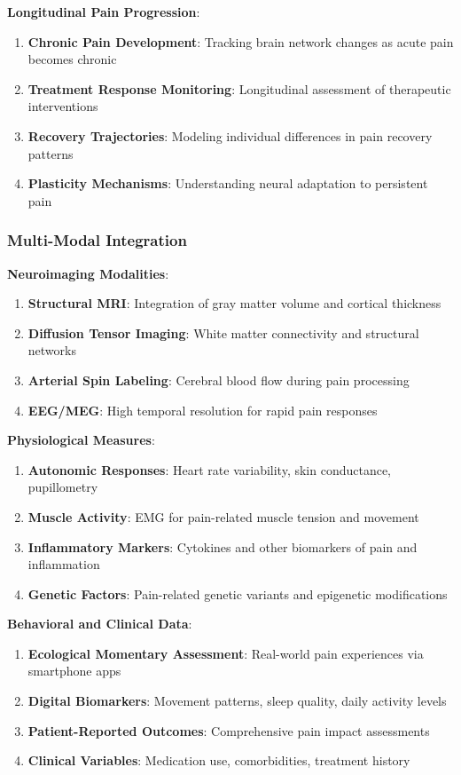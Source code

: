 \documentclass[10pt,journal,compsoc]{IEEEtran}
\begin{document}
\textbf{Longitudinal Pain Progression}:

\begin{enumerate}
\item \textbf{Chronic Pain Development}: Tracking brain network changes as acute pain becomes chronic
\item \textbf{Treatment Response Monitoring}: Longitudinal assessment of therapeutic interventions
\item \textbf{Recovery Trajectories}: Modeling individual differences in pain recovery patterns
\item \textbf{Plasticity Mechanisms}: Understanding neural adaptation to persistent pain
\end{enumerate}

\subsubsection{Multi-Modal Integration}

\textbf{Neuroimaging Modalities}:

\begin{enumerate}
\item \textbf{Structural MRI}: Integration of gray matter volume and cortical thickness
\item \textbf{Diffusion Tensor Imaging}: White matter connectivity and structural networks
\item \textbf{Arterial Spin Labeling}: Cerebral blood flow during pain processing
\item \textbf{EEG/MEG}: High temporal resolution for rapid pain responses
\end{enumerate}

\textbf{Physiological Measures}:

\begin{enumerate}
\item \textbf{Autonomic Responses}: Heart rate variability, skin conductance, pupillometry
\item \textbf{Muscle Activity}: EMG for pain-related muscle tension and movement
\item \textbf{Inflammatory Markers}: Cytokines and other biomarkers of pain and inflammation
\item \textbf{Genetic Factors}: Pain-related genetic variants and epigenetic modifications
\end{enumerate}

\textbf{Behavioral and Clinical Data}:

\begin{enumerate}
\item \textbf{Ecological Momentary Assessment}: Real-world pain experiences via smartphone apps
\item \textbf{Digital Biomarkers}: Movement patterns, sleep quality, daily activity levels
\item \textbf{Patient-Reported Outcomes}: Comprehensive pain impact assessments
\item \textbf{Clinical Variables}: Medication use, comorbidities, treatment history
\end{enumerate}
\end{document}
